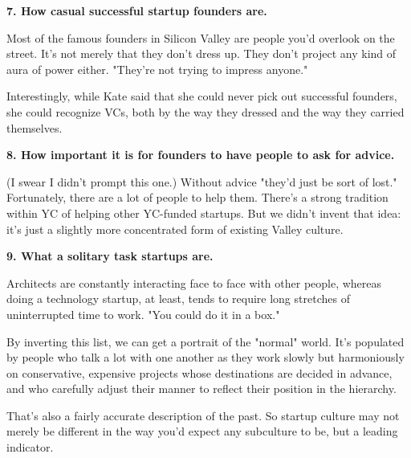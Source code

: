                   \textbf{7. How casual successful startup founders are.}

Most of the famous founders in Silicon Valley are
                  people you'd overlook on the street. It's not merely that they
                  don't dress up. They don't project any kind of aura of power
                  either. "They're not trying to impress anyone."

Interestingly,
                  while Kate said that she could never pick out successful
                  founders, she could recognize VCs, both by the way they
                  dressed and the way they carried themselves.


                  \textbf{8. How important it is for founders to have people to ask
                    for advice.}

(I swear I didn't prompt this one.) Without
                  advice "they'd just be sort of lost." Fortunately, there are a
                  lot of people to help them. There's a strong tradition within
                  YC of helping other YC-funded startups. But we didn't invent
                  that idea: it's just a slightly more concentrated form of
                  existing Valley culture.


                  \textbf{9. What a solitary task startups are.}

Architects are constantly interacting face to
                  face with other people, whereas doing a technology startup, at
                  least, tends to require long stretches of uninterrupted time
                  to work. "You could do it in a box."



By
                  inverting this list, we can get a portrait of the "normal"
                  world. It's populated by people who talk a lot with one
                  another as they work slowly but harmoniously on conservative,
                  expensive projects whose destinations are decided in advance,
                  and who carefully adjust their manner to reflect their
                  position in the hierarchy.

That's also a fairly
                  accurate description of the past. So startup culture may not
                  merely be different in the way you'd expect any subculture to
                  be, but a leading indicator.


              
            
          
